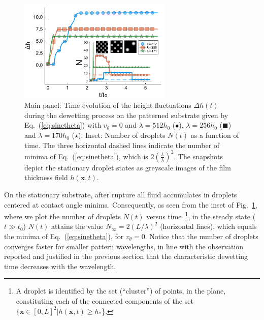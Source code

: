 \begin{figure}
    \centering
    \includegraphics[width=0.65\textwidth]{graphics/Figure_3.pdf}
    \caption{Main panel: Time evolution of the height fluctuations $\Delta h(t)$ during the dewetting process on the patterned substrate given by Eq.~(\ref{eq:sinetheta}) with $v_{\theta}= 0$ and $\lambda= 512 h_0$ (\textcolor{jlblue}{$\bullet$}), $\lambda=256 h_0$ (\textcolor{jlorange}{$\blacksquare$}) and $\lambda=170 h_0$ (\textcolor{jlgreen}{$\star$}). 
    Inset: Number of droplets $N(t)$ as a function of time. 
    The three horizontal dashed lines indicate the number of minima of Eq.~(\ref{eq:sinetheta}), which is $2\left(\frac{L}{\lambda}\right)^2$. 
    The snapshots depict the stationary droplet states as greyscale images of the film thickness field $h(\mathbf{x},t)$.
      }
    \label{fig:clusters_v0_sine}
\end{figure}
On the stationary substrate, after rupture all fluid accumulates in droplets centered at contact angle minima.
Consequently, as seen from the inset of Fig.~\ref{fig:clusters_v0_sine}, where we plot the number of droplets $N(t)$ versus time~\footnote{A droplet is identified by the set (``cluster'') of points, in the plane, constituting each of the connected components of the set $\{\mathbf{x} \in [0,L]^2 | h(\mathbf{x},t) \geq h_{\ast}$\}.}, in the steady state ($t \gg t_0$) $N(t)$ attains the value $N_{\infty} = 2(L/\lambda)^2$ (horizontal lines), which equals the minima of Eq.~(\ref{eq:sinetheta}), for $v_{\theta}=0$.
Notice that the number of droplets converges faster for smaller pattern wavelengths, in line with the observation reported and justified in the previous section that the characteristic dewetting time decreases with the wavelength.

